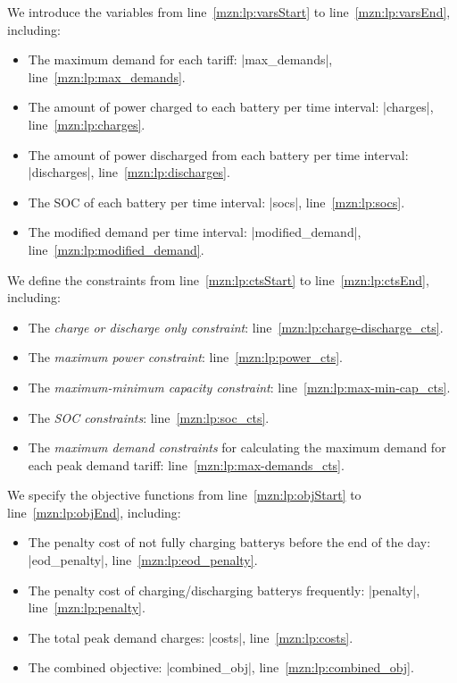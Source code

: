 We introduce the variables from line~\ref{mzn:lp:varsStart} to line~\ref{mzn:lp:varsEnd}, including:
\begin{itemize}
	\item The maximum demand for each tariff: \mzninline|max_demands|, line~\ref{mzn:lp:max_demands}.
	
	\item The amount of power charged to each battery per time interval: \mzninline|charges|, line~\ref{mzn:lp:charges}.
	
	\item The amount of power discharged from each battery per time interval: \mzninline|discharges|, line~\ref{mzn:lp:discharges}.
	
	\item The \gls{SOC} of each battery per time interval: \mzninline|socs|, line~\ref{mzn:lp:socs}.
	
	\item The modified demand per time interval: \mzninline|modified_demand|, line~\ref{mzn:lp:modified_demand}.
\end{itemize}

We define the constraints from line~\ref{mzn:lp:ctsStart} to line~\ref{mzn:lp:ctsEnd}, including:
\begin{itemize}
	\item The \textit{charge or discharge only constraint}: line~\ref{mzn:lp:charge-discharge_cts}.
	
	\item The \textit{maximum power constraint}: line~\ref{mzn:lp:power_cts}.
	
	\item The \textit{maximum-minimum capacity constraint}: line~\ref{mzn:lp:max-min-cap_cts}.
	
	\item The \textit{\gls{SOC} constraints}: line~\ref{mzn:lp:soc_cts}.
	
	\item The \textit{maximum demand constraints} for calculating the maximum demand for each peak demand tariff: line~\ref{mzn:lp:max-demands_cts}.
\end{itemize}

We specify the objective functions from line~\ref{mzn:lp:objStart} to line~\ref{mzn:lp:objEnd}, including:
\begin{itemize}
	
	\item The penalty cost of not fully charging \glspl{battery} before the end of the day: \mzninline|eod_penalty|, line~\ref{mzn:lp:eod_penalty}.
	
	\item The penalty cost of charging/discharging \glspl{battery} frequently: \mzninline|penalty|, line~\ref{mzn:lp:penalty}.
	
	\item The total peak demand charges: \mzninline|costs|, line~\ref{mzn:lp:costs}.
	
	\item The combined objective: \mzninline|combined_obj|, line~\ref{mzn:lp:combined_obj}.
\end{itemize}

